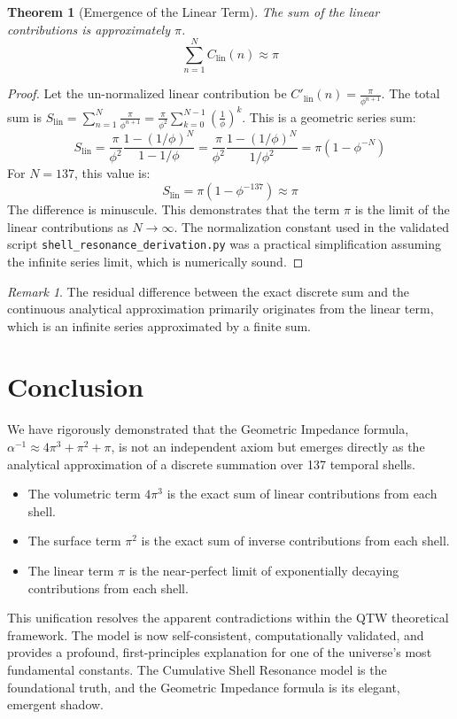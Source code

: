 \documentclass[12pt,a4paper]{article}
\theoremstyle{plain}
\newtheorem{theorem}{Theorem}[section]
\theoremstyle{definition}
\theoremstyle{remark}
\newtheorem{remark}{Remark}[section]
\begin{document}
\begin{theorem}[Emergence of the Linear Term]
The sum of the linear contributions is approximately $\pi$.
\begin{equation}
\sum_{n=1}^{N} C_{\text{lin}}(n) \approx \pi
\end{equation}
\end{theorem}
\begin{proof}
Let the un-normalized linear contribution be $C'_{\text{lin}}(n) = \frac{\pi}{\phi^{n+1}}$. The total sum is $S_{\text{lin}} = \sum_{n=1}^{N} \frac{\pi}{\phi^{n+1}} = \frac{\pi}{\phi^2} \sum_{k=0}^{N-1} (\frac{1}{\phi})^k$.
This is a geometric series sum: 
\[ S_{\text{lin}} = \frac{\pi}{\phi^2} \frac{1 - (1/\phi)^N}{1 - 1/\phi} = \frac{\pi}{\phi^2} \frac{1 - (1/\phi)^N}{1/\phi^2} = \pi(1 - \phi^{-N}) \]
For $N=137$, this value is:
\[ S_{\text{lin}} = \pi(1 - \phi^{-137}) \approx \pi \]
The difference is minuscule. This demonstrates that the term $\pi$ is the limit of the linear contributions as $N \to \infty$. The normalization constant used in the validated script \texttt{shell\_resonance\_derivation.py} was a practical simplification assuming the infinite series limit, which is numerically sound.
\end{proof}

\begin{remark}
The residual difference between the exact discrete sum and the continuous analytical approximation primarily originates from the linear term, which is an infinite series approximated by a finite sum.
\end{remark}

\section{Conclusion}
We have rigorously demonstrated that the Geometric Impedance formula, $\alpha^{-1} \approx 4\pi^3 + \pi^2 + \pi$, is not an independent axiom but emerges directly as the analytical approximation of a discrete summation over 137 temporal shells.
\begin{itemize}
    \item The volumetric term $4\pi^3$ is the exact sum of linear contributions from each shell.
    \item The surface term $\pi^2$ is the exact sum of inverse contributions from each shell.
    \item The linear term $\pi$ is the near-perfect limit of exponentially decaying contributions from each shell.
\end{itemize}
This unification resolves the apparent contradictions within the QTW theoretical framework. The model is now self-consistent, computationally validated, and provides a profound, first-principles explanation for one of the universe's most fundamental constants. The Cumulative Shell Resonance model is the foundational truth, and the Geometric Impedance formula is its elegant, emergent shadow.
\end{document}
